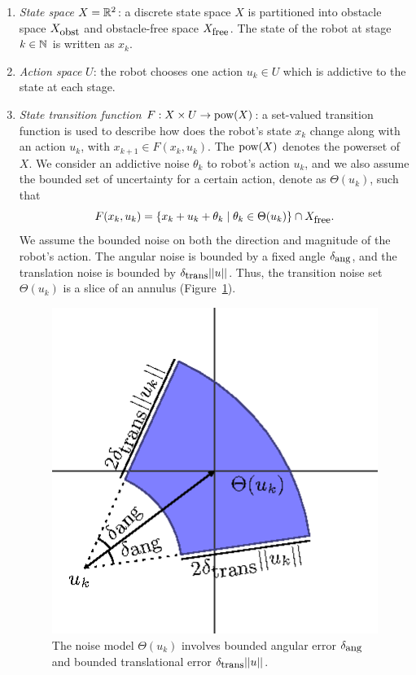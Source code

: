 \begin{enumerate}
\item \emph{State space} $X = \mathbb{R}^2$: a discrete state space $X$ is
  partitioned into obstacle space $X_{\mbox{\small obst}}$ and obstacle-free space
  $X_{\mbox{\small free}}$. The state of the robot at stage $k \in \mathbb{N}$ is written as
  $x_k$.
\item \emph{Action space} $U$: the robot chooses one action $u_k \in U$ which is
  addictive to the state at each stage.
\item \emph{State transition function} $F : X \times U \to \operatorname{pow}(X)$: a
  set-valued transition function is used to describe how does the robot's state $x_k$
  change along with an action $u_k$, with $x_{k+1} \in F(x_k, u_k)$. The
  $\operatorname{pow}(X)$ denotes the powerset of $X$. We consider an addictive noise
  $\theta_k$ to robot's action $u_k$, and we also assume the bounded set of
  uncertainty for a certain action, denote as $\Theta(u_k)$, such that
  \begin{equation}
    \label{eq:state-trans}
    F(x_k, u_k) = \left\{
      x_k + u_k + \theta_k
      \mid
      \theta_k \in \Theta(u_k)
    \right\} \cap X_{\mbox{\small free}}.
  \end{equation}
  We assume the bounded noise on both the direction and magnitude of the robot's
  action. 
  The angular noise is bounded by a fixed angle $\delta_{\mbox{\small ang}}$, and
  the translation noise is bounded by $\delta_{\mbox{\small trans}}||u||$. 
  Thus, the
  transition noise set $\Theta(u_k)$ is a slice of an annulus (Figure~\ref{fig:noiseModel}).
  \begin{figure}
    \centering
    \includegraphics[scale=1.2]{figs/noisemodel}
    \caption{The noise model $\Theta(u_k)$ involves bounded angular error
      $\delta_{\mbox{\small ang}}$ and bounded translational error
      $\delta_{\mbox{\small trans}}||u||$.}
    \label{fig:noiseModel}
  \end{figure}	


\end{enumerate}

